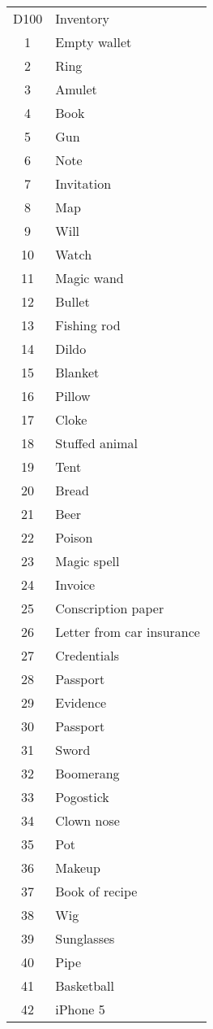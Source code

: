 \documentclass[11pt,a4paper,twocolumn]{article}
\begin{document}
\begin{supertabular}{cl}
    D100 & Inventory\\
    1 &Empty wallet\\
    2 &Ring\\
    3 &Amulet\\
    4 &Book\\
    5 &Gun\\
    6 &Note\\
    7 &Invitation\\
    8 &Map\\
    9 &Will\\
    10 &Watch\\
    11 &Magic wand\\
    12 &Bullet\\
    13 &Fishing rod\\
    14 &Dildo\\
    15 &Blanket\\
    16 &Pillow\\
    17 &Cloke\\
    18 &Stuffed animal\\
    19 &Tent\\
    20 &Bread\\
    21 &Beer\\
    22 &Poison\\
    23 &Magic spell\\
    24 &Invoice\\
    25 &Conscription paper\\
    26 &Letter from car insurance\\
    27 &Credentials\\
    28 &Passport\\
    29 &Evidence\\
    30 &Passport\\
    31 &Sword\\
    32 &Boomerang\\
    33 &Pogostick\\
    34 &Clown nose\\
    35 &Pot\\
    36 &Makeup\\
    37 &Book of recipe\\
    38 &Wig\\
    39 &Sunglasses\\
    40 &Pipe\\
    41 &Basketball\\
    42 &iPhone 5\\

\end{supertabular}
\end{document}
